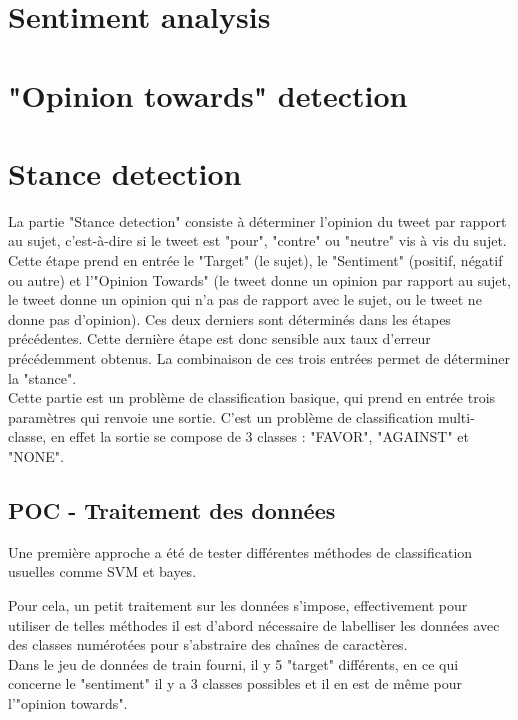 \section{Sentiment analysis}

\section{"Opinion towards" detection}

\section{Stance detection}

La partie "Stance detection" consiste à déterminer l'opinion du tweet par rapport au sujet, c'est-à-dire si le tweet est "pour", "contre" ou "neutre" vis à vis du sujet. Cette étape prend en entrée le "Target" (le sujet), le "Sentiment" (positif, négatif ou autre) et l'"Opinion Towards" (le tweet donne un opinion par rapport au sujet, le tweet donne un opinion qui n'a pas de rapport avec le sujet, ou le tweet ne donne pas d'opinion). Ces deux derniers sont déterminés dans les étapes précédentes. Cette dernière étape est donc sensible aux taux d'erreur précédemment obtenus.
La combinaison de ces trois entrées permet de déterminer la "stance". \\

Cette partie est un problème de classification basique, qui prend en entrée trois paramètres qui renvoie une sortie. C'est un problème de classification multi-classe, en effet la sortie se compose de 3 classes : "FAVOR", "AGAINST" et "NONE". \\

\subsection{POC - Traitement des données}

Une première approche a été de tester différentes méthodes de classification usuelles comme SVM et bayes.

Pour cela, un petit traitement sur les données s'impose, effectivement pour utiliser de telles méthodes il est d'abord nécessaire de labelliser les données avec des classes numérotées pour s'abstraire des chaînes de caractères. \\
Dans le jeu de données de train fourni, il y 5 "target" différents, en ce qui concerne le "sentiment" il y a 3 classes possibles et il en est de même pour l'"opinion towards".

